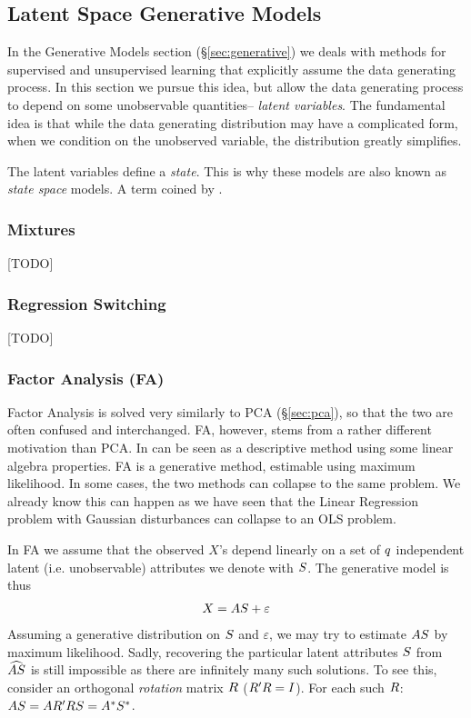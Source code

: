 \subsection{Latent Space Generative Models}
\label{sec:latent_space}

In the Generative Models section (\S\ref{sec:generative}) we deals with methods for supervised and unsupervised learning that explicitly assume the data generating process.
In this section we pursue this idea, but allow the data generating process to depend on some unobservable quantities-- \emph{latent variables}.
The fundamental idea is that while the data generating distribution may have a complicated form, when we condition on the unobserved variable, the distribution greatly simplifies. 

The latent variables define a \emph{state}. This is why these models are also known as \emph{state space} models. A term coined by \citet{kalman_contributions_1960}.

\subsubsection{Mixtures}
[TODO]


\subsubsection{Regression Switching}
[TODO]



\subsubsection{Factor Analysis (FA)}
\label{sec:factor_analysis}

Factor Analysis is solved very similarly to PCA (\S\ref{sec:pca}), so that the two are often confused and interchanged. 
FA, however, stems from a rather different motivation than PCA.
In can be seen as a descriptive method using some linear algebra properties.
FA is a generative method, estimable using maximum likelihood. In some cases, the two methods can collapse to the same problem. 
We already know this can happen as we have seen that the Linear Regression problem with Gaussian disturbances can collapse to an OLS problem. 

In FA we assume that the observed $X$'s depend linearly on a set of $q$ independent latent (i.e. unobservable) attributes we denote with $S$.
The generative model is thus
\begin{align}
\label{eq:factor}
	X=A S+\varepsilon
\end{align}
Assuming a generative distribution on $S$ and $\varepsilon$, we may try to estimate $A S$ by maximum likelihood.
Sadly, recovering the particular latent attributes $S$ from $\widehat{AS}$ is still impossible as there are infinitely many such solutions. To see this, consider an orthogonal \emph{rotation} matrix $R$ ($R' R=I$). For each such $R$: $ A S=A R' R S = A^* S^*$.

